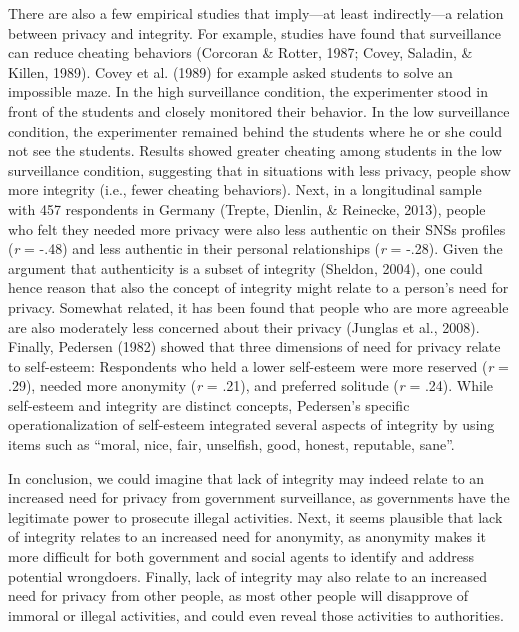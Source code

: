 \documentclass[man,floatsintext]{apa6}
\begin{document}
There are also a few empirical studies that imply---at least indirectly---a relation between privacy and integrity. For example, studies have found that surveillance can reduce cheating behaviors (Corcoran \& Rotter, 1987; Covey, Saladin, \& Killen, 1989). Covey et al. (1989) for example asked students to solve an impossible maze. In the high surveillance condition, the experimenter stood in front of the students and closely monitored their behavior. In the low surveillance condition, the experimenter remained behind the students where he or she could not see the students. Results showed greater cheating among students in the low surveillance condition, suggesting that in situations with less privacy, people show more integrity (i.e., fewer cheating behaviors). Next, in a longitudinal sample with 457 respondents in Germany (Trepte, Dienlin, \& Reinecke, 2013), people who felt they needed more privacy were also less authentic on their SNSs profiles (\emph{r} = -.48) and less authentic in their personal relationships (\emph{r} = -.28). Given the argument that authenticity is a subset of integrity (Sheldon, 2004), one could hence reason that also the concept of integrity might relate to a person's need for privacy. Somewhat related, it has been found that people who are more agreeable are also moderately less concerned about their privacy (Junglas et al., 2008). Finally, Pedersen (1982) showed that three dimensions of need for privacy relate to self-esteem: Respondents who held a lower self-esteem were more reserved (\emph{r} = .29), needed more anonymity (\emph{r} = .21), and preferred solitude (\emph{r} = .24). While self-esteem and integrity are distinct concepts, Pedersen's specific operationalization of self-esteem integrated several aspects of integrity by using items such as \enquote{moral, nice, fair, unselfish, good, honest, reputable, sane}.

In conclusion, we could imagine that lack of integrity may indeed relate to an increased need for privacy from government surveillance, as governments have the legitimate power to prosecute illegal activities. Next, it seems plausible that lack of integrity relates to an increased need for anonymity, as anonymity makes it more difficult for both government and social agents to identify and address potential wrongdoers. Finally, lack of integrity may also relate to an increased need for privacy from other people, as most other people will disapprove of immoral or illegal activities, and could even reveal those activities to authorities.
\end{document}
